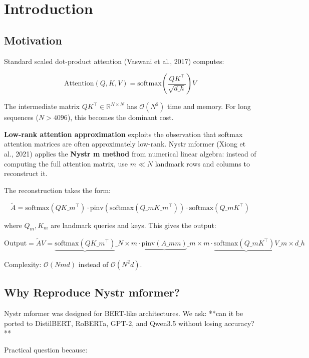 
\section{Introduction}

\subsection{Motivation}

Standard scaled dot-product attention (Vaswani et al., 2017) computes:

\[
\mathrm{Attention}(Q, K, V) = \mathrm{softmax}\!\left(\frac{Q K^\top}{\sqrt{d\_h}}\right) V
\tag{1.1}
\]

The intermediate matrix $Q K^\top \in \mathbb{R}^{N \times N}$ has 
$\mathcal{O}(N^2)$ time and memory. For long sequences ($N > 4096$), this 
becomes the dominant cost.

\textbf{Low-rank attention approximation} exploits the observation that softmax 
attention matrices are often approximately low-rank. Nystr mformer (Xiong 
et al., 2021) applies the \textbf{Nystr m method} from numerical linear algebra: 
instead of computing the full attention matrix, use $m \ll N$ landmark 
rows and columns to reconstruct it.

The reconstruction takes the form:

\[
\tilde{A} = \text{softmax}(Q K\_m^\top) \cdot \text{pinv}(\text{softmax}(Q\_m K\_m^\top)) \cdot \text{softmax}(Q\_m K^\top)
\tag{1.2}
\]

where $Q_m, K_m$ are landmark queries and keys. This gives the output:

\[
\text{Output} = \tilde{A} V = \underbrace{\text{softmax}(Q K\_m^\top)}\_{N \times m} \cdot \underbrace{\text{pinv}(A\_{mm})}\_{m \times m} \cdot \underbrace{\text{softmax}(Q\_m K^\top) V}\_{m \times d\_h}
\tag{1.3}
\]

Complexity: $\mathcal{O}(N m d)$ instead of $\mathcal{O}(N^2 d)$.

\subsection{Why Reproduce Nystr mformer?}

Nystr mformer was designed for BERT-like architectures. We ask: **can it 
be ported to DistilBERT, RoBERTa, GPT-2, and Qwen3.5 without losing 
accuracy?**

Practical question because:

